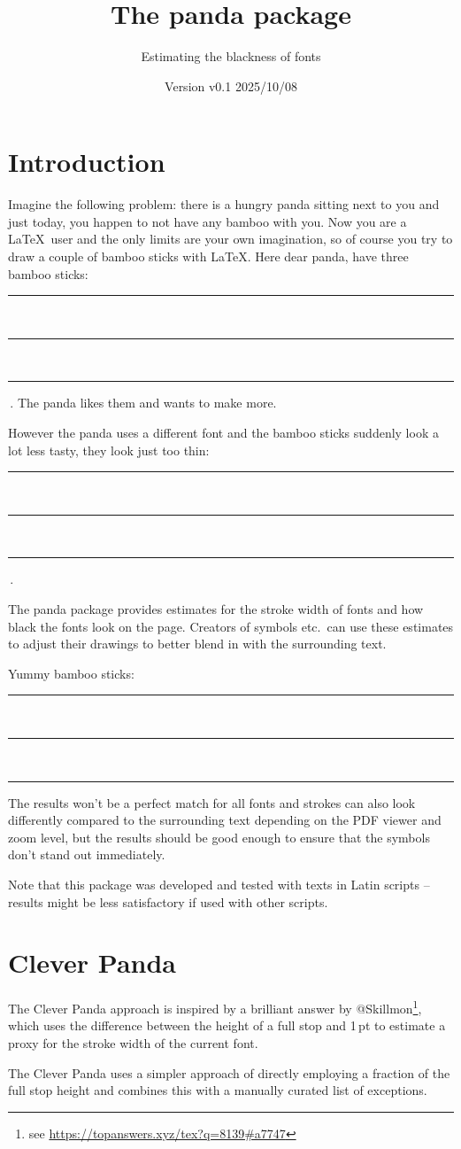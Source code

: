 \documentclass{scrartcl}
\title{The panda package}
\subtitle{Estimating the blackness of fonts}
\author{%
  \texorpdfstring{
   \begin{tikzpicture}
     \colorlet{black}{samdgray}
     \panda
   \end{tikzpicture}\\[0.8em]
   \texttt{samcarter}\\
   \url{https://github.com/samcarter/panda}\\
   \url{https://ctan.org/pkg/panda}
  }{samcarter}}
\date{Version v0.1 \textendash{} 2025/10/08}
\newcommand{\badbamboo}[2]{%
  \rule{#1}{#2}\,\rule{#1}{#2}\,\rule{#1}{#2}%
}
\newcommand{\busybamboo}{%
  \rule{ \BusyPanda{0.125}\fontcharht\font`I }{ \fontcharht\font`I }%
}
\begin{document}
\maketitle

\section{Introduction}
\label{intro}

Imagine the following problem:
there is a hungry panda sitting next to you and just today, you happen to not have any bamboo with you.
Now you are a \LaTeX\ user and the only limits are your own imagination, so of course you try to draw a couple of bamboo sticks with \LaTeX.
Here dear panda, have three bamboo sticks: \badbamboo{0.8pt}{\fontcharht\font`I}\,.
The panda likes them and wants to make more.
{\selectfont However the panda uses a different font and the bamboo sticks suddenly look a lot less tasty, they look just too thin: \badbamboo{0.8pt}{\fontcharht\font`I}\,.}

The panda package provides estimates for the stroke width of fonts and how black the fonts look on the page.
Creators of symbols etc.\ can use these estimates to adjust their drawings to better blend in with the surrounding text.

{\selectfont Yummy bamboo sticks: \busybamboo\,\busybamboo\,\busybamboo}

The results won't be a perfect match for all fonts and strokes can also look differently compared to the surrounding text depending on the PDF viewer and zoom level, but the results should be good enough to ensure that the symbols don't stand out immediately.

Note that this package was developed and tested with texts in Latin scripts -- results might be less satisfactory if used with other scripts.

\blurb

\section{Clever Panda}

The Clever Panda approach is inspired by a brilliant answer by @Skillmon\footnote{see \url{https://topanswers.xyz/tex?q=8139\#a7747}}, which uses the difference between the height of a full stop and 1\,pt to estimate a proxy for the stroke width of the current font.

The Clever Panda uses a simpler approach of directly employing a fraction of the full stop height and combines this with a manually curated list of exceptions.
\end{document}
